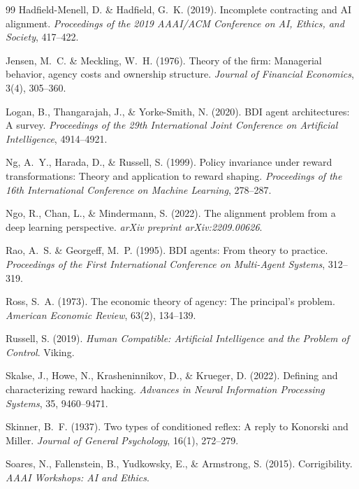 \documentclass[12pt,a4paper]{article}
\begin{document}
\begin{thebibliography}{99}
Hadfield-Menell, D. \& Hadfield, G.~K. (2019). Incomplete contracting and AI alignment. \emph{Proceedings of the 2019 AAAI/ACM Conference on AI, Ethics, and Society}, 417--422.

Jensen, M.~C. \& Meckling, W.~H. (1976). Theory of the firm: Managerial behavior, agency costs and ownership structure. \emph{Journal of Financial Economics}, 3(4), 305--360.

Logan, B., Thangarajah, J., \& Yorke-Smith, N. (2020). BDI agent architectures: A survey. \emph{Proceedings of the 29th International Joint Conference on Artificial Intelligence}, 4914--4921.

Ng, A.~Y., Harada, D., \& Russell, S. (1999). Policy invariance under reward transformations: Theory and application to reward shaping. \emph{Proceedings of the 16th International Conference on Machine Learning}, 278--287.

Ngo, R., Chan, L., \& Mindermann, S. (2022). The alignment problem from a deep learning perspective. \emph{arXiv preprint arXiv:2209.00626}.

Rao, A.~S. \& Georgeff, M.~P. (1995). BDI agents: From theory to practice. \emph{Proceedings of the First International Conference on Multi-Agent Systems}, 312--319.

Ross, S.~A. (1973). The economic theory of agency: The principal's problem. \emph{American Economic Review}, 63(2), 134--139.

Russell, S. (2019). \emph{Human Compatible: Artificial Intelligence and the Problem of Control}. Viking.

Skalse, J., Howe, N., Krasheninnikov, D., \& Krueger, D. (2022). Defining and characterizing reward hacking. \emph{Advances in Neural Information Processing Systems}, 35, 9460--9471.

Skinner, B.~F. (1937). Two types of conditioned reflex: A reply to Konorski and Miller. \emph{Journal of General Psychology}, 16(1), 272--279.

Soares, N., Fallenstein, B., Yudkowsky, E., \& Armstrong, S. (2015). Corrigibility. \emph{AAAI Workshops: AI and Ethics}.


\end{thebibliography}
\end{document}
